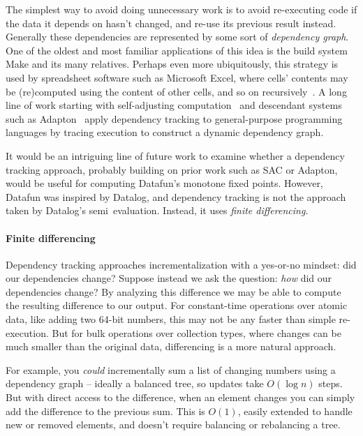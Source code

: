 The simplest way to avoid doing unnecessary work is to avoid re-executing code
if the data it depends on hasn't changed, and re-use its previous result
instead.
%
Generally these dependencies are represented by some sort of \emph{dependency
  graph}.
%
One of the oldest and most familiar applications of this idea is the build
system Make and its many relatives.
%
Perhaps even more ubiquitously, this strategy is used by spreadsheet software such as Microsoft Excel, where cells' contents may be (re)computed using the content of other cells, and so on recursively~\citep{build-systems-a-la-carte}.
%
A long line of work starting with self-adjusting
computation~\citep{DBLP:conf/popl/AcarBH02,umut-acar-thesis} and descendant
systems such as Adapton~\citep{DBLP:conf/pldi/HammerKHF14} apply dependency
tracking to general-purpose programming languages by tracing execution to
construct a dynamic dependency graph.

It would be an intriguing line of future work to examine whether a dependency
tracking approach, probably building on prior work such as SAC or Adapton, would
be useful for computing Datafun's monotone fixed points. However, Datafun was
inspired by Datalog, and dependency tracking is not the approach taken by
Datalog's semi\naive\ evaluation. Instead, it uses \emph{finite differencing.}

\paragraph{Finite differencing}


Dependency tracking approaches incrementalization with a yes-or-no mindset: did
our dependencies change?
%
%
Suppose instead we ask the question: \emph{how} did our dependencies change?
%
By analyzing this difference we may be able to compute the resulting difference
to our output.
%
%
For constant-time operations over atomic data, like adding two 64-bit numbers,
this may not be any faster than simple re-execution.
%
But for bulk operations over collection types, where changes can be much smaller
than the original data, differencing is a more natural approach.

For example, you \emph{could} incrementally sum a list of changing numbers using
a dependency graph -- ideally a balanced tree, so updates take $O(\log
n)$ steps.
%
But with direct access to the difference, when an element changes you can simply
add the difference to the previous sum. This is $O(1)$, easily extended to
handle new or removed elements, and doesn't require balancing or rebalancing a
tree.

